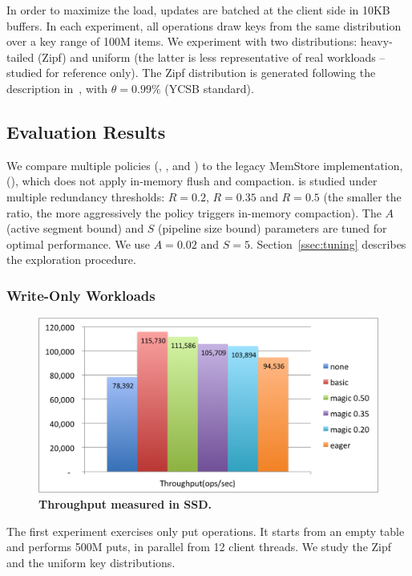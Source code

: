 In order to maximize the load, updates are batched at the client side in 10KB buffers. 
In each experiment, all operations draw keys from the same distribution over a key range
of 100M items. We experiment with two distributions: heavy-tailed (Zipf) and uniform (the latter 
is less representative of real workloads -- studied for reference only). The Zipf distribution 
is generated following the description in~\cite{Gray:1994:QGB:191839.191886}, with $\theta=0.99\%$ 
(YCSB standard).

\subsection{Evaluation Results}
\label{ssec:results}

We compare multiple \sys\/ policies (\basic, \eager, and \adp\/) to the legacy MemStore implementation,
(\none), which does not apply in-memory flush and compaction. \adp\/ is studied under multiple 
redundancy thresholds: $R=0.2$, $R=0.35$ and $R=0.5$ (the smaller the ratio, the more aggressively
the policy triggers in-memory compaction).  The $A$ (active segment bound) and $S$ (pipeline size bound) 
parameters are tuned for optimal performance. We use $A=0.02$ and $S=5$. Section~\ref{ssec:tuning} 
describes the exploration procedure. 

\subsubsection{Write-Only Workloads}

\begin{figure}[tb]
\includegraphics[width=\figw]{Figs/throughput-ssd.png}
\caption{{\bf  Throughput measured in SSD.} 
}
\label{fig:write-throughput}
\end{figure}

The first experiment exercises only put operations. It starts from an empty table and performs 500M puts, 
in parallel from 12 client threads. We study the Zipf and the uniform key distributions.  

